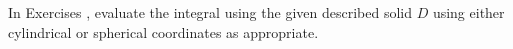 {\noindent In Exercises} 
{,  evaluate the integral using the given described solid $D$ using either cylindrical or spherical coordinates as appropriate.}
